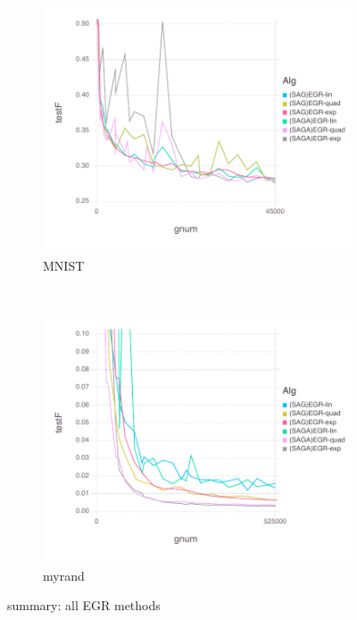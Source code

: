 \documentclass[11pt]{article}
\begin{document}
      \begin{figure}[H]
          \centering
          \begin{subfigure}[b]{0.45\textwidth}
              \includegraphics[width=\textwidth]{Figures/MNISTBLtrueFfFinal-1.pdf}
              \caption{MNIST}
          \end{subfigure}
          ~ %
            \begin{subfigure}[b]{0.45\textwidth}
           \includegraphics[width=\textwidth]{Figures/myrandBLtrueFfFinal-1.pdf}
                \caption{myrand}
            \end{subfigure}
          \caption{summary: all EGR methods}\label{fig:MNISTsummary}
      \end{figure}
   
\end{document}
